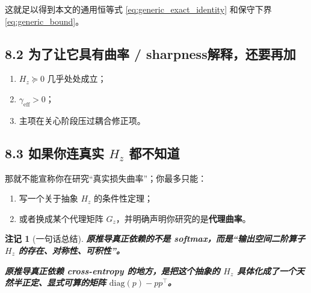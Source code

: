 \documentclass[11pt]{ctexart}
\newtheorem{remark}{注记}
\begin{document}
这就足以得到本文的通用恒等式 \eqref{eq:generic_exact_identity} 和保守下界 \eqref{eq:generic_bound}。

\subsection*{8.2 为了让它具有\textbf{曲率 / sharpness}解释，还要再加}

\begin{enumerate}[label=\textbf{(B\arabic*)}]
    \item $H_z \succeq 0$ 几乎处处成立；
    \item $\gamma_{\mathrm{eff}} > 0$；
    \item 主项在关心阶段压过耦合修正项。
\end{enumerate}

\subsection*{8.3 如果你连真实 $H_z$ 都不知道}

那就不能宣称你在研究“真实损失曲率”；你最多只能：

\begin{enumerate}[label=\arabic*.]
    \item 写一个关于抽象 $H_z$ 的条件性定理；
    \item 或者换成某个代理矩阵 $G_z$，并明确声明你研究的是\textbf{代理曲率}。
\end{enumerate}

\begin{remark}[一句话总结]
\textbf{原推导真正依赖的不是 softmax，而是“输出空间二阶算子 $H_z$ 的存在、对称性、可积性”。}

\textbf{原推导真正依赖 cross-entropy 的地方，是把这个抽象的 $H_z$ 具体化成了一个天然半正定、显式可算的矩阵 $\mathrm{diag}(p)-pp^\top$。}
\end{remark}
\end{document}
